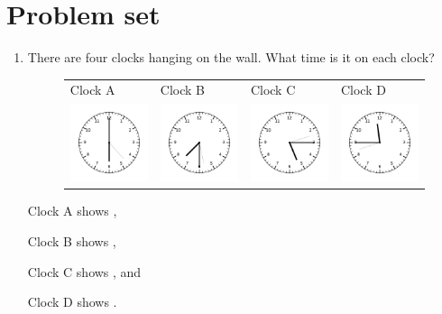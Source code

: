 \documentclass{tufte-book}
\providecommand{\tabularnewline}{\\}
\begin{document}
\clearpage\section{Problem set }

\begin{enumerate}
\item There are four clocks hanging on the wall. What time is it on each clock?\medskip\par
\begin{figure}[h]
  \centering
  \begin{tabular}{>{\centering}p{}>{\centering}p{}>{\centering}p{}>{\centering}p{}}
  Clock A & Clock B & Clock C & Clock D\tabularnewline
  \includegraphics[width=0.33\columnwidth]{fig/clock_1800.pdf} & \includegraphics[width=0.33\columnwidth]{fig/clock_0730.pdf} & \includegraphics[width=0.33\columnwidth]{fig/clock_0515.pdf} & \includegraphics[width=0.33\columnwidth]{fig/clock_1145.pdf}\tabularnewline
  \end{tabular}
\end{figure}
Clock A shows \dotfill\medskip,\par
Clock B shows \dotfill\medskip,\par
Clock C shows \dotfill\medskip, and\par
Clock D shows \dotfill\medskip.


\end{enumerate}
\end{document}
